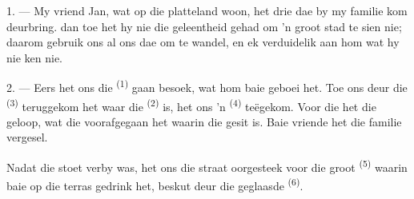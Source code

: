%
%
%
%

\VUsaut{4.0mm}
\VUsaut{3.0mm}

\VUsaut{3.0mm}

1. --- My vriend Jan, wat op die platteland woon, het drie dae by my familie kom
deurbring.  dan toe het hy nie die geleentheid gehad om 'n groot stad te sien
nie; daarom gebruik ons al ons dae om te wandel, en ek verduidelik aan hom wat hy nie
ken nie.

2. --- Eers het ons die  \textsuperscript{(1)} gaan besoek, wat hom
baie geboei het. Toe ons deur die  \textsuperscript{(3)} teruggekom het
waar die  \textsuperscript{(2)} is, het ons 'n 
\textsuperscript{(4)} teëgekom. Voor die  het die 
geloop, wat die  voorafgegaan het waarin die  gesit is. Baie
vriende het die  familie vergesel.

Nadat die stoet verby was, het ons die straat oorgesteek voor die groot 
\textsuperscript{(5)} waarin baie   op die terras
gedrink het, beskut deur die geglaasde  \textsuperscript{(6)}.

